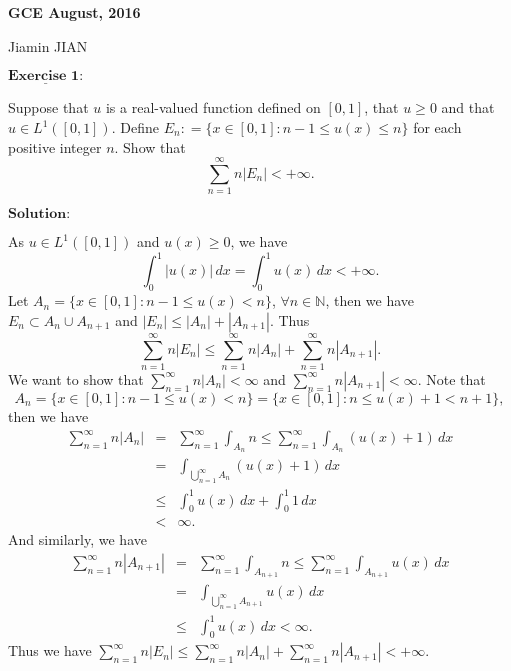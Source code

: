 \documentclass[12pt,a4paper]{ctexart}
\begin{document}
\begin{center}
\textbf{ GCE August, 2016}
\vspace{8pt}

Jiamin JIAN
\end{center}

\vspace{12pt}

$\underline{\textbf{Exercise 1:}}$

Suppose that $u$ is a real-valued function defined on $[0, 1]$, that $u \geq 0$ and that $u \in L^{1}([0, 1])$. Define $E_{n} : = \{x \in [0, 1]: n - 1 \leq u(x) \leq n \}$ for each positive integer $n$. Show that
\begin{equation*}
    \sum_{n = 1}^{\infty} n |E_{n}| < + \infty.
\end{equation*}

\vspace{8pt}

$\textbf{Solution:}$

As $u \in L^{1}([0, 1])$ and $u(x) \geq 0$, we have
\begin{equation*}
    \int_{0}^{1} |u (x)| \, d x = \int_{0}^{1} u (x) \, d x < + \infty.
\end{equation*}
Let $A_n = \{x \in [0,1]: n-1 \leq u(x) < n \}$, $\forall n \in \mathbb N$, then we have $E_n \subset A_n \cup A_{n+1}$ and $|E_n| \leq |A_n| + |A_{n+1}|$. Thus
$$\sum_{n = 1}^{\infty} n |E_n| \leq \sum_{n = 1}^{\infty} n |A_n| + \sum_{n = 1}^{\infty} n |A_{n+1}|.$$
We want to show that $\sum_{n = 1}^{\infty} n |A_{n}| < \infty$ and $\sum_{n = 1}^{\infty} n |A_{n+1}| < \infty$. Note that
$$A_n = \{x \in [0,1]: n-1 \leq u(x) < n \} = \{x \in [0,1]: n \leq u(x) + 1 < n+1 \},$$
then we have
\begin{eqnarray*}
\sum_{n = 1}^{\infty} n |A_{n}| & = &  \sum_{n = 1}^{\infty} \int_{A_n}^{} n \leq  \sum_{n = 1}^{\infty} \int_{A_n}^{} (u(x) + 1) \, d x \\
& = &  \int_{\bigcup_{n=1}^{\infty} A_n} (u(x) + 1) \, d x \\
& \leq &  \int_{0}^{1} u(x) \, d x + \int_{0}^{1} 1 \, d x \\
& < & \infty.
\end{eqnarray*}
And similarly, we have
\begin{eqnarray*}
\sum_{n = 1}^{\infty} n |A_{n+1}| & = &  \sum_{n = 1}^{\infty} \int_{A_{n+1}}^{} n  \leq  \sum_{n = 1}^{\infty} \int_{A_{n+1}}^{} u(x) \, d x \\
& = &  \int_{\bigcup_{n=1}^{\infty} A_{n+1}} u(x) \, d x \\
& \leq &  \int_{0}^{1} u(x) \, d x  <  \infty.
\end{eqnarray*}
Thus we have $\sum_{n = 1}^{\infty} n |E_n| \leq \sum_{n = 1}^{\infty} n |A_n| + \sum_{n = 1}^{\infty} n |A_{n+1}| < + \infty$.
\end{document}
